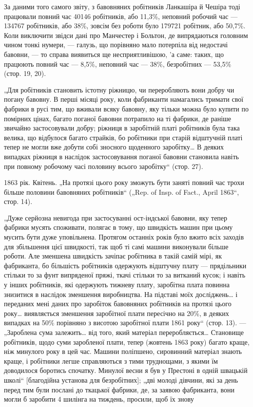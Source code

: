 
За даними того самого звіту, з бавовняних робітників Ланкашіра
й Чешіра тоді працювали повний час \num{40146} робітників,
або 11,3\%, неповний робочий час — \num{134767} робітників, або 38\%,
зовсім без роботи було \num{179721} робітник, або 50,7\%. Коли виключити
звідси дані про Манчестер і Больтон, де випрядаються
головним чином тонкі нумери, — галузь, що порівняно мало потерпіла
від недостачі бавовни, — то справа виявиться ще несприятливішою, 'а
саме: таких, що працюють повний час — 8,5\%,
неповний час — 38\%, безробітних — 53,5\% (стор. 19, 20).

„Для робітників становить істотну ріжницю, чи переробляють
вони добру чи погану бавовну. В перші місяці року, коли фабриканти
намагались тримати свої фабрики в русі тим, що вживали
всяку бавовну, яку тільки можна було купити по помірних цінах,
багато поганої бавовни потрапило на ті фабрики, де раніше звичайно
застосовували добру; ріжниця в заробітній платі робітників
була така велика, що відбулося багато страйків, бо робітники
при старій відштучній платі тепер не могли вже добути
собі зносного щоденного заробітку\dots{} В деяких випадках ріжниця
в наслідок застосовування поганої бавовни становила навіть при
повному робочому часі половину всього заробітку“ (стор. 27).

1863 рік. Квітень. „На протязі цього року зможуть бути заняті
повний час трохи більше половини бавовняних робітників“
(„Rep. of Insp. of Fact., April 1863“, стор. 14).

„Дуже серйозна невигода при застосуванні ост-індської бавовни,
яку тепер фабрики мусять споживати, полягає в тому,
що швидкість машин при цьому мусить бути дуже уповільнена.
Протягом останніх років було вжито всіх заходів для збільшення
цієї швидкості, так щоб ті самі машини виконували більше
роботи. Але зменшена швидкість зачіпає робітника в такій самій
мірі, як фабриканта, бо більшість робітників одержують відштучну
плату — прядільники стільки то за фунт випряденої
пряжі, ткачі стільки то за витканий кусок; і навіть у інших
робітників, які одержують тижневу плату, заробітна плата повинна
знизитися в наслідок зменшення виробництва. На підставі
моїх досліджень\dots{} і переданих мені даних про заробіток бавовняних
робітників на протязі цього року\dots{} виявляється зменшення
заробітної плати пересічно на 20\%, в деяких випадках
на 50\% порівняно з висотою заробітної плати 1861 року“
(стор. 13). — „Зароблена сума залежить\dots{} від того, який матеріал
переробляється\dots{} Становище робітників, щодо суми заробленої
плати, тепер (жовтень 1863 року) багато краще, ніж минулого
року в цей час. Машини поліпшено, сировинний матеріал
знають краще, і робітники легше справляються з тими труднощами,
з якими їм доводилося боротись спочатку. Минулої весни
я був у Престоні в одній швацькій школі“ [благодійна установа
для безробітних]; „дві молоді дівчини, які за день перед тим
були послані до ткацької фабрики, де, за заявою фабриканта, вони
могли б заробити 4 шилінга на тиждень, просили, щоб їх знову
\parbreak{}  %
